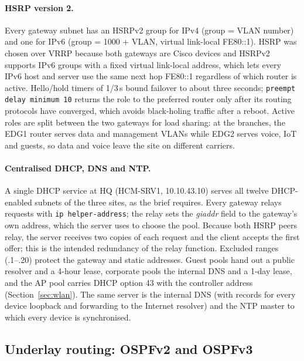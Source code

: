 \documentclass[11pt,a4paper]{article}
\begin{document}
\paragraph{HSRP version 2.} Every gateway subnet has an HSRPv2 group for IPv4 (group = VLAN number) and one for IPv6 (group = 1000 + VLAN, virtual link-local FE80::1). HSRP was chosen over VRRP because both gateways are Cisco devices and HSRPv2 supports IPv6 groups with a fixed virtual link-local address, which lets every IPv6 host and server use the same next hop FE80::1 regardless of which router is active. Hello/hold timers of 1/3\,s bound failover to about three seconds; \texttt{preempt delay minimum 10} returns the role to the preferred router only after its routing protocols have converged, which avoids black-holing traffic after a reboot. Active roles are split between the two gateways for load sharing: at the branches, the EDG1 router serves data and management VLANs while EDG2 serves voice, IoT and guests, so data and voice leave the site on different carriers.



\paragraph{Centralised DHCP, DNS and NTP.} A single DHCP service at HQ (HCM-SRV1, 10.10.43.10) serves all twelve DHCP-enabled subnets of the three sites, as the brief requires. Every gateway relays requests with \texttt{ip helper-address}; the relay sets the \emph{giaddr} field to the gateway's own address, which the server uses to choose the pool. Because both HSRP peers relay, the server receives two copies of each request and the client accepts the first offer; this is the intended redundancy of the relay function. Excluded ranges (.1--.20) protect the gateway and static addresses. Guest pools hand out a public resolver and a 4-hour lease, corporate pools the internal DNS and a 1-day lease, and the AP pool carries DHCP option 43 with the controller address (Section~\ref{sec:wlan}). The same server is the internal DNS (with records for every device loopback and forwarding to the Internet resolver) and the NTP master to which every device is synchronised.



\subsection{Underlay routing: OSPFv2 and OSPFv3}
\label{sec:ospf}
\end{document}
